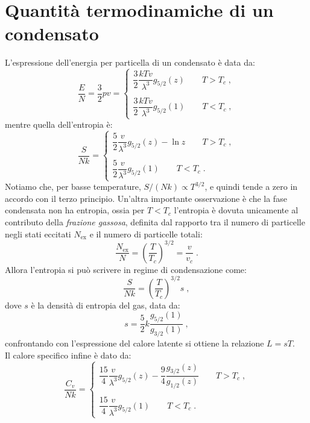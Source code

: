 \documentclass[10pt,a4paper]{report}
\theoremstyle{definition}
\numberwithin{equation}{section}
\begin{document}
\section{Quantità termodinamiche di un condensato}
L'espressione dell'energia per particella di un condensato è data da:
\begin{equation}
\frac{E}{N}=\frac{3}{2}pv=\begin{cases}
\dfrac{3}{2}\dfrac{kTv}{\lambda^3}g_{5/2}(z)\qquad T>T_c\;, \\
\\
\dfrac{3}{2}\dfrac{kTv}{\lambda^3}g_{5/2}(1)\qquad T<T_c\;,
\end{cases}
\end{equation}
mentre quella dell'entropia è:
\begin{equation}
\frac{S}{Nk}=\begin{cases}
\dfrac{5}{2}\dfrac{v}{\lambda^3}g_{5/2}(z)-\ln z\qquad T>T_c\;, \\
\\
\dfrac{5}{2}\dfrac{v}{\lambda^3}g_{5/2}(1)\qquad T<T_c\;.
\end{cases}
\end{equation}
Notiamo che, per basse temperature, $S/(Nk)\propto T^{3/2}$, e quindi tende a zero in accordo con il terzo principio. Un'altra importante osservazione è che la fase condensata non ha entropia, ossia per $T<T_c$ l'entropia è dovuta unicamente al contributo della \emph{frazione gassosa}, definita dal rapporto tra il numero di particelle negli stati eccitati $N_{\mathrm{ex}}$ e il numero di particelle totali:
\begin{equation}
\frac{N_{\mathrm{ex}}}{N}=\left(\frac{T}{T_c}\right)^{3/2}=\frac{v}{v_c}\;.
\end{equation}
Allora l'entropia si può scrivere in regime di condensazione come:
\begin{equation}
\frac{S}{Nk}=\left(\frac{T}{T_c}\right)^{3/2}s\;,
\end{equation}
dove $s$ è la densità di entropia del gas, data da:
\begin{equation}
s=\frac{5}{2}k\frac{g_{5/2}(1)}{g_{3/2}(1)}\;,
\end{equation}
confrontando con l'espressione del calore latente si ottiene la relazione $L=sT$. \\
Il calore specifico infine è dato da:
\begin{equation}
\frac{C_v}{Nk}=\begin{cases}
\dfrac{15}{4}\dfrac{v}{\lambda^3}g_{5/2}(z)-\dfrac{9}{4}\dfrac{g_{3/2}(z)}{g_{1/2}(z)}\qquad T>T_c \;,\\
\\
\dfrac{15}{4}\dfrac{v}{\lambda^3}g_{5/2}(1)\qquad T<T_c\;.
\end{cases}
\end{equation}
\end{document}
